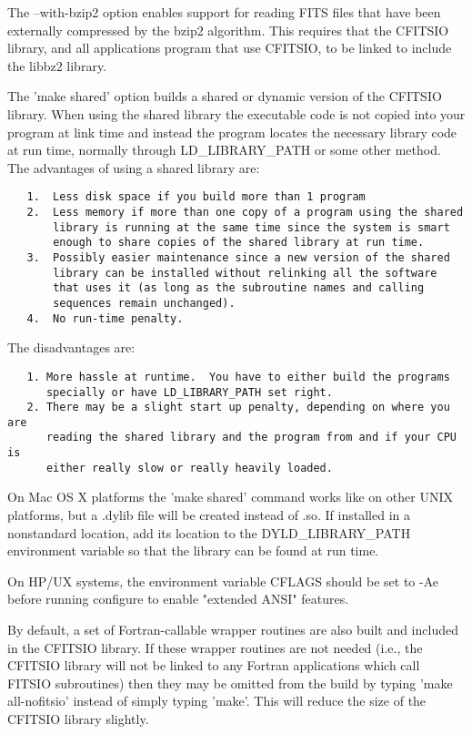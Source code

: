 \documentclass[11pt]{book}
\begin{document}
The --with-bzip2 option enables support for reading FITS files that have been
externally compressed by the bzip2 algorithm.  This requires that the CFITSIO
library, and all applications program that use CFITSIO, to be linked to include
the libbz2 library.

The 'make shared' option builds a shared or dynamic version of the
CFITSIO library.  When using the shared library the executable code is
not copied into your program at link time and instead the program
locates the necessary library code at run time, normally through
LD\_LIBRARY\_PATH or some other method. The advantages of using a shared
library are:

\begin{verbatim}
   1.  Less disk space if you build more than 1 program
   2.  Less memory if more than one copy of a program using the shared
       library is running at the same time since the system is smart
       enough to share copies of the shared library at run time.
   3.  Possibly easier maintenance since a new version of the shared
       library can be installed without relinking all the software
       that uses it (as long as the subroutine names and calling
       sequences remain unchanged).
   4.  No run-time penalty.
\end{verbatim}
The disadvantages are:

\begin{verbatim}
   1. More hassle at runtime.  You have to either build the programs
      specially or have LD_LIBRARY_PATH set right.
   2. There may be a slight start up penalty, depending on where you are
      reading the shared library and the program from and if your CPU is
      either really slow or really heavily loaded.
\end{verbatim}

On Mac OS X platforms the 'make shared' command works like on other
UNIX platforms, but a .dylib file will be created instead of .so.  If
installed in a nonstandard location, add its location to the
DYLD\_LIBRARY\_PATH environment variable so that the library can be found
at run time.

On HP/UX systems, the environment variable CFLAGS should be set
to -Ae before running configure to enable "extended ANSI" features.

By default, a set of Fortran-callable wrapper routines are
also built and included in the CFITSIO library.  If these wrapper
routines are not needed (i.e., the CFITSIO library will not
be linked to any Fortran applications which call FITSIO subroutines)
then they may be omitted from the build by typing 'make all-nofitsio'
instead of simply typing 'make'.  This will reduce the size
of the CFITSIO library slightly.
\end{document}
